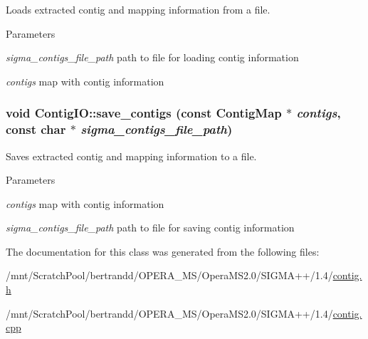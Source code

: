 Loads extracted contig and mapping information from a file. 
\begin{DoxyParams}{Parameters}
\item[{\em sigma\_\-contigs\_\-file\_\-path}]path to file for loading contig information \item[{\em contigs}]map with contig information \end{DoxyParams}
\hypertarget{classContigIO_acf14e24e110dc3284984e9fa00725678}{
\subsubsection[{save\_\-contigs}]{\setlength{\rightskip}{0pt plus 5cm}void ContigIO::save\_\-contigs (const {\bf ContigMap} $\ast$ {\em contigs}, \/  const char $\ast$ {\em sigma\_\-contigs\_\-file\_\-path})}}
\label{classContigIO_acf14e24e110dc3284984e9fa00725678}


Saves extracted contig and mapping information to a file. 
\begin{DoxyParams}{Parameters}
\item[{\em contigs}]map with contig information \item[{\em sigma\_\-contigs\_\-file\_\-path}]path to file for saving contig information \end{DoxyParams}


The documentation for this class was generated from the following files:\begin{DoxyCompactItemize}
\item 
/mnt/ScratchPool/bertrandd/OPERA\_\-MS/OperaMS2.0/SIGMA++/1.4/\hyperlink{contig_8h}{contig.h}\item 
/mnt/ScratchPool/bertrandd/OPERA\_\-MS/OperaMS2.0/SIGMA++/1.4/\hyperlink{contig_8cpp}{contig.cpp}\end{DoxyCompactItemize}
